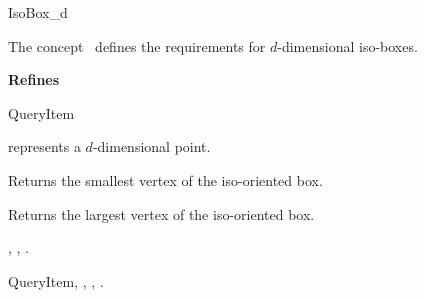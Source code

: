 

\begin{ccRefConcept}{IsoBox_d}


\ccDefinition
  
The concept \ccRefName\ defines the requirements for $d$-dimensional iso-boxes.

{\bf Refines}

QueryItem

\ccParameters

 represents a $d$-dimensional point.



\ccOperations

{Returns the smallest vertex of the iso-oriented box.}


{Returns the largest vertex of the iso-oriented box.}


\ccHasModels

, , 
.

\ccSeeAlso

QueryItem, , , 
.


\end{ccRefConcept}


